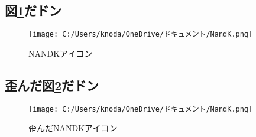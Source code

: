 \documentclass[a4paper, uplatex]{jlreq}
\newcommand{\明石}{明石工業高等専門がおっこう電機情報工学科}
\begin{document}
	\subsection{図\ref{nandk1}だドン}
	\begin{figure}[http]
		\centering
		\texttt{[image: C:/Users/knoda/OneDrive/ドキュメント/NandK.png]}
		\caption{NANDKアイコン}
		\label{nandk1}
	\end{figure}
	
	\newpage
	\subsection{歪んだ図\ref{nandk2}だドン}
	\begin{figure}[http]
		\centering
		\texttt{[image: C:/Users/knoda/OneDrive/ドキュメント/NandK.png]}
		\caption{歪んだNANDKアイコン}
		\label{nandk2}
	\end{figure}
	
	
	
	
	
	
\end{document}
